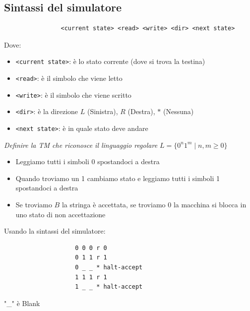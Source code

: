 \documentclass[12pt, a4paper]{report}
\begin{document}
            \subsection{Sintassi del simulatore}
            \begin{verbatim}
                <current state> <read> <write> <dir> <next state>
            \end{verbatim}
            \vspace{-1cm}
            Dove: \begin{itemize}
                \item \texttt{<current state>}: è lo stato corrente (dove si trova la testina)
                \item \texttt{<read>}: è il simbolo che viene letto
                \item \texttt{<write>}: è il simbolo che viene scritto
                \item \texttt{<dir>}: è la direzione $L$ (Sinistra), $R$ (Destra), $*$ (Nessuna)
                \item \texttt{<next state>}: è in quale stato deve andare
            \end{itemize}
            \begin{example}
                \textit{Definire la TM che riconosce il linguaggio regolare $L=\{0^n1^m\mid n,m\geq 0\}$}
                \begin{itemize}
                    \item Leggiamo tutti i simboli 0 spostandoci a destra
                    \item Quando troviamo un 1 cambiamo stato e leggiamo tutti i simboli 1 spostandoci a destra
                    \item Se troviamo $B$ la stringa è accettata, se troviamo 0 la macchina si blocca in uno stato di non accettazione
                \end{itemize}
                Usando la sintassi del simulatore:
                \begin{verbatim}
                    0 0 0 r 0
                    0 1 1 r 1
                    0 _ _ * halt-accept
                    1 1 1 r 1
                    1 _ _ * halt-accept
                \end{verbatim}
                "\_" è Blank
            \end{example}
\end{document}
